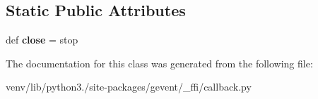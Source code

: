 \subsection*{Static Public Attributes}
\begin{DoxyCompactItemize}
\item 
\mbox{\label{classgevent_1_1__ffi_1_1callback_1_1callback_acfa5b3b5bb0238a633981c2c231b41c3}} 
def {\bfseries close} = stop
\end{DoxyCompactItemize}


The documentation for this class was generated from the following file\+:\begin{DoxyCompactItemize}
\item 
venv/lib/python3./site-\/packages/gevent/\+\_\+ffi/callback.\+py\end{DoxyCompactItemize}

